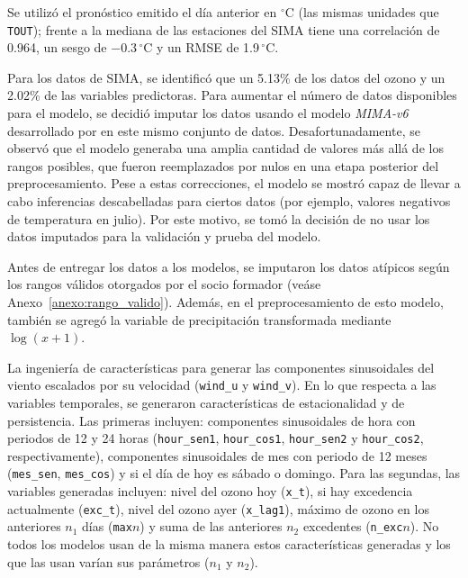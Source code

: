 \documentclass[11pt]{article}
\begin{document}
Se utilizó el pronóstico emitido el día anterior en $^\circ$C (las mismas unidades que \texttt{TOUT}); frente a la mediana de las estaciones del SIMA tiene una correlación de 0.964, un sesgo de $-0.3\,^\circ$C y un RMSE de 1.9\,$^\circ$C.


Para los datos de SIMA, se identificó que un 5.13\% de los datos del ozono y un 2.02\% de las variables predictoras. Para aumentar el número de datos disponibles para el modelo, se decidió imputar los datos usando el modelo \textit{MIMA-v6} desarrollado por \citet{gomezsantos2027hybrid} en este mismo conjunto de datos. Desafortunadamente, se observó que el modelo generaba una amplia cantidad de valores más allá de los rangos posibles, que fueron reemplazados por nulos en una etapa posterior del preprocesamiento. Pese a estas correcciones, el modelo se mostró capaz de llevar a cabo inferencias descabelladas para ciertos datos (por ejemplo, valores negativos de temperatura en julio). Por este motivo, se tomó la decisión de no usar los datos imputados para la validación y prueba del modelo.


Antes de entregar los datos a los modelos, se imputaron los datos atípicos según los rangos válidos otorgados por el socio formador (veáse Anexo~\ref{anexo:rango_valido}). Además, en el preprocesamiento de esto modelo, también se agregó la variable de precipitación transformada mediante $\log(x+1)$.

La ingeniería de características para generar las componentes sinusoidales del viento escalados por su velocidad (\texttt{wind\_u} y \texttt{wind\_v}). En lo que respecta a las variables temporales, se generaron características de estacionalidad y de persistencia. Las primeras incluyen: componentes sinusoidales de hora con periodos de 12 y 24 horas (\texttt{hour\_sen1}, \texttt{hour\_cos1}, \texttt{hour\_sen2} y \texttt{hour\_cos2}, respectivamente), componentes sinusoidales de mes con periodo de 12 meses (\texttt{mes\_sen}, \texttt{mes\_cos}) y si el día de hoy es sábado o domingo. Para las segundas, las variables generadas incluyen: nivel del ozono hoy (\texttt{x\_t}), si hay excedencia actualmente (\texttt{exc\_t}), nivel del ozono ayer (\texttt{x\_lag1}), máximo de ozono en los anteriores $n_1$ días (\texttt{max$n$}) y suma de las anteriores $n_2$ excedentes (\texttt{n\_exc$n$}). No todos los modelos usan de la misma manera estos características generadas y los que las usan varían sus parámetros ($n_1$ y $n_2$).
\end{document}
